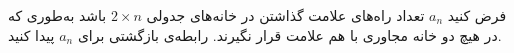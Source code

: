     \p 
فرض کنید
$a_n$
تعداد راه‌های علامت گذاشتن در خانه‌های جدولی
$2 \times n$
باشد به‌طوری که در هیچ دو خانه مجاوری با هم علامت قرار نگیرند. رابطه‌ی بازگشتی برای
$a_n$
پیدا کنید.